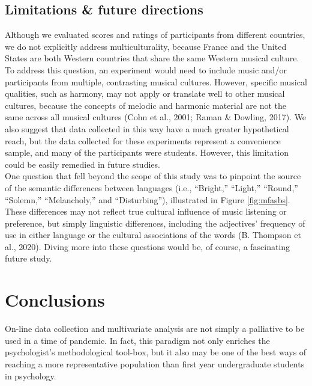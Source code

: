 \documentclass[
  english,
  man,floatsintext]{apa6}
\begin{document}
\hypertarget{limitations-future-directions}{%
\subsection{Limitations \& future directions}\label{limitations-future-directions}}

Although we evaluated scores and ratings of participants from different countries, we do not explicitly address multiculturality, because France and the United States are both Western countries that share the same Western musical culture. To address this question, an experiment would need to include music and/or participants from multiple, contrasting musical cultures. However, specific musical qualities, such as harmony, may not apply or translate well to other musical cultures, because the concepts of melodic and harmonic material are not the same across all musical cultures (Cohn et al., 2001; Raman \& Dowling, 2017). We also suggest that data collected in this way have a much greater hypothetical reach, but the data collected for these experiments represent a convenience sample, and many of the participants were students. However, this limitation could be easily remedied in future studies.\\
One question that fell beyond the scope of this study was to pinpoint the source of the semantic differences between languages (i.e., ``Bright,'' ``Light,'' ``Round,'' ``Solemn,'' ``Melancholy,'' and ``Disturbing''), illustrated in Figure \ref{fig:mfasbs}. These differences may not reflect true cultural influence of music listening or preference, but simply linguistic differences, including the adjectives' frequency of use in either language or the cultural associations of the words (B. Thompson et al., 2020). Diving more into these questions would be, of course, a fascinating future study.

\hypertarget{conclusions}{%
\section{Conclusions}\label{conclusions}}

On-line data collection and multivariate analysis are not simply a palliative to be used in a time of pandemic. In fact, this paradigm not only enriches the psychologist's methodological tool-box, but it also may be one of the best ways of reaching a more representative population than first year undergraduate students in psychology.

\newpage
\end{document}
